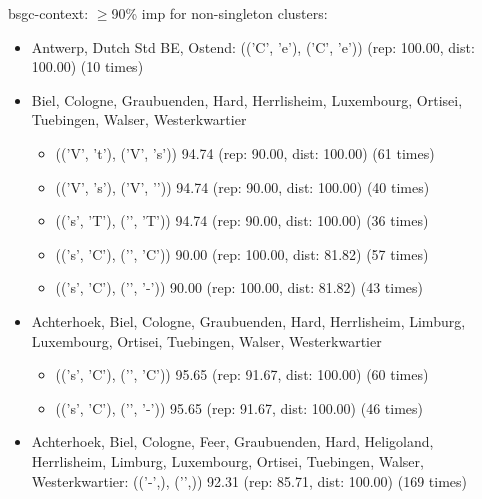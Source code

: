 \documentclass[a4paper]{article}
\begin{document}
bsgc-context: $\geq$90\% imp for non-singleton clusters:
\begin{itemize}
\item Antwerp, Dutch Std BE, Ostend:
(('C', 'e'), ('C', 'e\textlengthmark')) (rep: 100.00, dist: 100.00) (10 times)
\item Biel, Cologne, Graubuenden, Hard, Herrlisheim, Luxembourg, Ortisei, Tuebingen, Walser, Westerkwartier
\begin{itemize}
\item (('V', 't'), ('V', 's'))  94.74   (rep: 90.00, dist: 100.00)  (61 times)
\item (('V', 's'), ('V', '\textesh'))   94.74   (rep: 90.00, dist: 100.00)  (40 times)
\item (('s', 'T'), ('\textesh', 'T'))   94.74   (rep: 90.00, dist: 100.00)  (36 times)
\item (('s', 'C'), ('\textesh', 'C'))   90.00   (rep: 100.00, dist: 81.82)  (57 times)
\item (('s', 'C'), ('\textesh', '-'))   90.00   (rep: 100.00, dist: 81.82)  (43 times)
\end{itemize}
\item Achterhoek, Biel, Cologne, Graubuenden, Hard, Herrlisheim, Limburg, Luxembourg, Ortisei, Tuebingen, Walser, Westerkwartier
\begin{itemize}
\item (('s', 'C'), ('\textesh', 'C'))   95.65   (rep: 91.67, dist: 100.00)  (60 times)
\item (('s', 'C'), ('\textesh', '-'))   95.65   (rep: 91.67, dist: 100.00)  (46 times)
\end{itemize}
\item Achterhoek, Biel, Cologne, Feer, Graubuenden, Hard, Heligoland, Herrlisheim, Limburg, Luxembourg, Ortisei, Tuebingen, Walser, Westerkwartier: 
(('-',), ('\textglotstop',))    92.31   (rep: 85.71, dist: 100.00)  (169 times)
\end{itemize}
\end{document}
